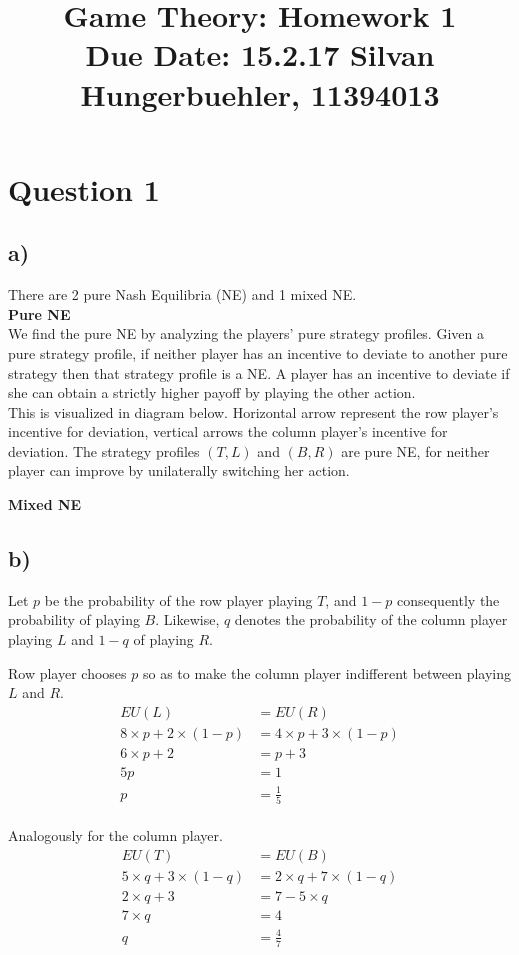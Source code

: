 \documentclass[10pt,a4paper]{article}
\title{%
  Game Theory: Homework 1 \\
  \large Due Date: 15.2.17
  \large Silvan Hungerbuehler, 11394013}
\date{}
\begin{document}
\maketitle

\section*{Question 1}
\subsection*{a)}
There are 2 pure Nash Equilibria (NE) and 1 mixed NE.\\
\textbf{Pure NE}\\
We find the pure NE by analyzing the players' pure strategy profiles. Given a pure strategy profile, if neither player has  an incentive to deviate to another pure strategy then that strategy profile is a NE. A player has an incentive to deviate if she can obtain a strictly higher payoff by playing the other action.\\
This is visualized in diagram below. Horizontal arrow represent the row player's incentive for deviation, vertical arrows the column player's incentive for deviation. The strategy profiles $(T,L)$ and $(B,R)$ are pure NE, for neither player can improve by unilaterally switching her action.

\textbf{Mixed NE}

\subsection*{b)}
Let $p$ be the probability of the row player playing $T$, and $1-p$ consequently the probability of playing $B$. Likewise, $q$ denotes the probability of the column player  playing $L$ and $1-q$ of playing $R$.

Row player chooses $p$ so as to make the column player indifferent between playing $L$ and $R$.\\
\begin{align*}
EU(L)&=EU(R)\\
8\times p + 2\times (1-p)&= 4\times p + 3\times (1-p) \\
6\times p + 2 &= p+3 \\
5p &= 1 \\
p &= \tfrac{1}{5}
\end{align*}\\
Analogously for the column player.\\
\begin{align*}
EU(T)&=EU(B)\\
5\times q + 3\times (1-q)&= 2\times q + 7\times (1-q) \\
2\times q + 3 &= 7-5\times q \\
7\times q &= 4 \\
q &= \tfrac{4}{7}
\end{align*}
\end{document}
